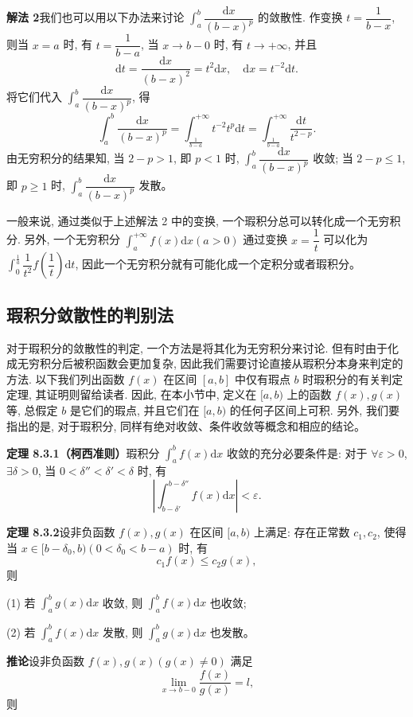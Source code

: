 \documentclass[UTF8,12pt,a4paper,fontset=fandol]{ctexart}
\begin{document}
\noindent\textbf{解法 2}\quad 我们也可以用以下办法来讨论 $\int_a^b\dfrac{\mathrm dx}{(b-x)^p}$ 的敛散性. 作变换 $t=\dfrac1{b-x}$, 则当 $x=a$ 时, 有 $t=\dfrac1{b-a}$, 当 $x\to b-0$ 时, 有 $t\to+\infty$, 并且
\[
  \mathrm dt=\frac{\mathrm dx}{(b-x)^2}=t^2\mathrm dx,\quad
  \mathrm dx=t^{-2}\mathrm dt.
\]
将它们代入 $\int_a^b\dfrac{\mathrm dx}{(b-x)^p}$, 得
\[
  \int_a^b\frac{\mathrm dx}{(b-x)^p}
  =
  \int_{\frac1{b-a}}^{+\infty}t^{-2}t^p\mathrm dt
  =
  \int_{\frac1{b-a}}^{+\infty}\frac{\mathrm dt}{t^{2-p}}.
\]
由无穷积分的结果知, 当 $2-p>1$, 即 $p<1$ 时, $\int_a^b\dfrac{\mathrm dx}{(b-x)^p}$ 收敛; 当 $2-p\leq1$, 即 $p\geq1$ 时, $\int_a^b\dfrac{\mathrm dx}{(b-x)^p}$ 发散。

一般来说, 通过类似于上述解法 2 中的变换, 一个瑕积分总可以转化成一个无穷积分. 另外, 一个无穷积分 $\int_a^{+\infty}f(x)\mathrm dx(a>0)$ 通过变换 $x=\dfrac1t$ 可以化为 $\int_0^{\frac1a}\dfrac1{t^2}f\left(\dfrac1t\right)\mathrm dt$, 因此一个无穷积分就有可能化成一个定积分或者瑕积分。

\subsection{瑕积分敛散性的判别法}

对于瑕积分的敛散性的判定, 一个方法是将其化为无穷积分来讨论. 但有时由于化成无穷积分后被积函数会更加复杂, 因此我们需要讨论直接从瑕积分本身来判定的方法. 以下我们列出函数 $f(x)$ 在区间 $[a,b]$ 中仅有瑕点 $b$ 时瑕积分的有关判定定理, 其证明则留给读者. 因此, 在本小节中, 定义在 $[a,b)$ 上的函数 $f(x),g(x)$ 等, 总假定 $b$ 是它们的瑕点, 并且它们在 $[a,b)$ 的任何子区间上可积. 另外, 我们要指出的是, 对于瑕积分, 同样有绝对收敛、条件收敛等概念和相应的结论。

\noindent\textbf{定理 8.3.1（柯西准则）}\quad 瑕积分 $\int_a^b f(x)\mathrm dx$ 收敛的充分必要条件是: 对于 $\forall\varepsilon>0$, $\exists\delta>0$, 当 $0<\delta''<\delta'<\delta$ 时, 有
\[
  \left|\int_{b-\delta'}^{b-\delta''}f(x)\mathrm dx\right|<\varepsilon.
\]

\noindent\textbf{定理 8.3.2}\quad 设非负函数 $f(x),g(x)$ 在区间 $[a,b)$ 上满足: 存在正常数 $c_1,c_2$, 使得当 $x\in[b-\delta_0,b)(0<\delta_0<b-a)$ 时, 有
\[
  c_1f(x)\leq c_2g(x),
\]
则

(1) 若 $\int_a^b g(x)\mathrm dx$ 收敛, 则 $\int_a^b f(x)\mathrm dx$ 也收敛;

(2) 若 $\int_a^b f(x)\mathrm dx$ 发散, 则 $\int_a^b g(x)\mathrm dx$ 也发散。

\noindent\textbf{推论}\quad 设非负函数 $f(x),g(x)(g(x)\ne0)$ 满足
\[
  \lim_{x\to b-0}\frac{f(x)}{g(x)}=l,
\]
则
\end{document}
